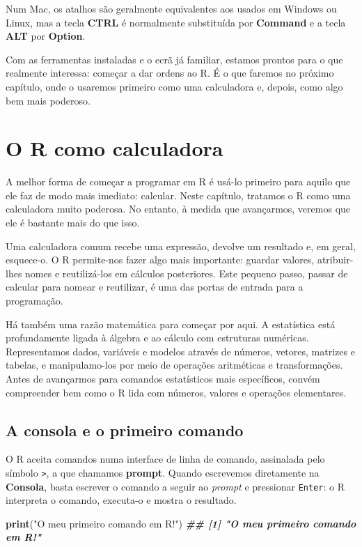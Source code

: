 \documentclass[
  portuguese,
  11pt,
  openany]{book}
\newenvironment{Shaded}{\begin{snugshade}}{\end{snugshade}}
\newcommand{\DocumentationTok}[1]{\textcolor[rgb]{0.56,0.35,0.01}{\textbf{\textit{#1}}}}
\newcommand{\FunctionTok}[1]{\textcolor[rgb]{0.13,0.29,0.53}{\textbf{#1}}}
\newcommand{\NormalTok}[1]{#1}
\newcommand{\StringTok}[1]{\textcolor[rgb]{0.31,0.60,0.02}{#1}}
\begin{document}
Num Mac, os atalhos são geralmente equivalentes aos usados em Windows ou
Linux, mas a tecla \textbf{CTRL} é normalmente substituída por \textbf{Command} e a
tecla \textbf{ALT} por \textbf{Option}.

Com as ferramentas instaladas e o ecrã já familiar, estamos prontos para o que
realmente interessa: começar a dar ordens ao R. É o que faremos no próximo
capítulo, onde o usaremos primeiro como uma calculadora e, depois, como algo bem
mais poderoso.

\chapter{O R como calculadora}\label{calculadora}

A melhor forma de começar a programar em R é usá-lo primeiro para aquilo que ele faz de modo mais imediato: calcular. Neste capítulo, tratamos o R como uma calculadora muito poderosa. No entanto, à medida que avançarmos, veremos que ele é bastante mais do que isso.

Uma calculadora comum recebe uma expressão, devolve um resultado e, em geral, esquece-o. O R permite-nos fazer algo mais importante: guardar valores, atribuir-lhes nomes e reutilizá-los em cálculos posteriores. Este pequeno passo, passar de calcular para nomear e reutilizar, é uma das portas de entrada para a programação.

Há também uma razão matemática para começar por aqui. A estatística está profundamente ligada à álgebra e ao cálculo com estruturas numéricas. Representamos dados, variáveis e modelos através de números, vetores, matrizes e tabelas, e manipulamo-los por meio de operações aritméticas e transformações. Antes de avançarmos para comandos estatísticos mais específicos, convém compreender bem como o R lida com números, valores e operações elementares.

\section{A consola e o primeiro comando}\label{a-consola-e-o-primeiro-comando}

O R aceita comandos numa interface de linha de comando, assinalada pelo símbolo \texttt{\textgreater{}}, a que chamamos \textbf{prompt}. Quando escrevemos diretamente na \textbf{Consola}, basta escrever o comando a seguir ao \emph{prompt} e pressionar \texttt{Enter}: o R interpreta o comando, executa-o e mostra o resultado.

\begin{Shaded}
\begin{Highlighting}[]
\FunctionTok{print}\NormalTok{(}\StringTok{"O meu primeiro comando em R!"}\NormalTok{)}
\DocumentationTok{\#\# [1] "O meu primeiro comando em R!"}
\end{Highlighting}
\end{Shaded}
\end{document}
